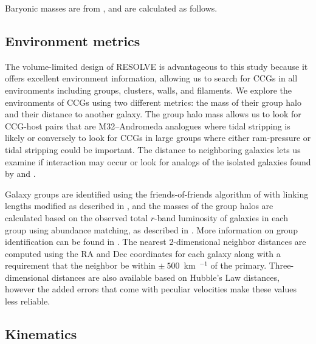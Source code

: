 \documentclass[iop,apj]{emulateapj}
\begin{document}
Baryonic masses are from \citet{Eckert2016}, and are calculated as follows. 


\subsection{Environment metrics}
\label{env}
The volume-limited design of RESOLVE is advantageous to this study because it offers excellent environment information, allowing us to search for CCGs in all environments including groups, clusters, walls, and filaments. We explore the environments of CCGs using two different metrics: the mass of their group halo and their distance to another galaxy. The group halo mass allows us to look for CCG-host pairs that are M32--Andromeda analogues where tidal stripping is likely or conversely to look for CCGs in large groups where either ram-pressure or tidal stripping could be important. The distance to neighboring galaxies lets us examine if interaction may occur or look for analogs of the isolated galaxies found by \citet{Huxor2013} and \citet{Paudel2014}.

Galaxy groups are identified using the friends-of-friends algorithm of \citet{Berlind2006} with linking lengths modified as described in \citet{Eckert2016}, and the masses of the group halos are calculated based on the observed total $r$-band luminosity of galaxies in each group using abundance matching, as described in \citet{Blanton2007}. More information on group identification can be found in \citet{Eckert2016}. The nearest 2-dimensional neighbor distances are computed using the RA and Dec coordinates for each galaxy along with a requirement that the neighbor be within $\pm~500$~km~$^{-1}$ of the primary. Three-dimensional distances are also available based on Hubble's Law distances, however the added errors that come with peculiar velocities make these values less reliable.

\subsection{Kinematics}
\label{kindata}
\end{document}
